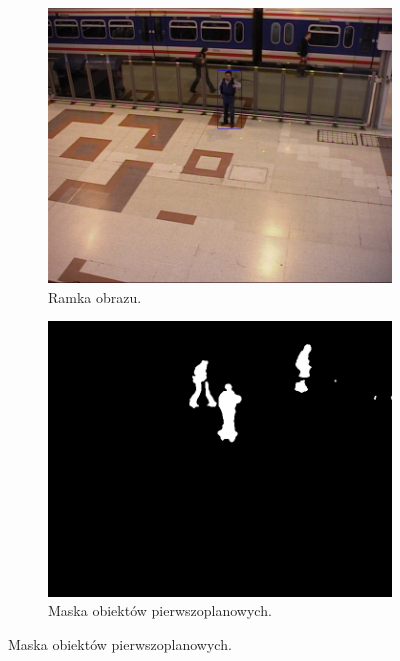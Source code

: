 \begin{figure}[H]
	\centering
	\begin{subfigure}[b]{0.49\textwidth}
		\includegraphics[width=\textwidth]{img/bg-input.png}
		\caption{Ramka obrazu.}
		\vspace{1ex}
	\end{subfigure}
	\hfill
	\begin{subfigure}[b]{0.49\textwidth}
		\includegraphics[width=\textwidth]{img/bg-fg.png}
		\caption{Maska obiektów pierwszoplanowych.}
		\vspace{1ex}
	\end{subfigure}


\end{figure}
